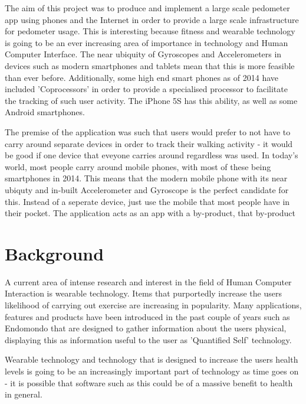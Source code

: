 \documentclass{l4proj}
\begin{document}
The aim of this project was to produce and implement a large scale pedometer app using phones and the Internet in order to provide a large scale infrastructure for pedometer usage. This is interesting because fitness and wearable technology is going to be an ever increasing area of importance in technology and Human Computer Interface. The near ubiquity of Gyroscopes and Accelerometers in devices such as modern smartphones and tablets mean that this is more feasible than ever before. Additionally, some high end smart phones as of 2014 have included 'Coprocessors' in order to provide a specialised processor to facilitate the tracking of such user activity. The iPhone 5S has this ability, as well as some Android smartphones. 

The premise of the application was such that users would prefer to not have to carry around separate devices in order to track their walking activity - it would be good if one device that eveyone carries around regardless was used. In today's world, most people carry around mobile phones, with most of these being smartphones in 2014. This means that the modern mobile phone with its near ubiquty and in-built Accelerometer and Gyroscope is the perfect candidate for this. Instead of a seperate device, just use the mobile that most people have in their pocket. The application acts as an app with a by-product, that by-product 

\section{Background}

A current area of intense research and interest in the field of Human Computer Interaction is wearable technology. Items that purportedly increase the users likelihood of carrying out exercise are increasing in popularity. Many applications, features and products have been introduced in the past couple of years such as Endomondo that are designed to gather information about the users physical, displaying this as information useful to the user as 'Quantified Self' technology. 

Wearable technology and technology that is designed to increase the users health levels is going to be an increasingly important part of technology as time goes on - it is possible that software such as this could be of a massive benefit to health in general.
\end{document}

